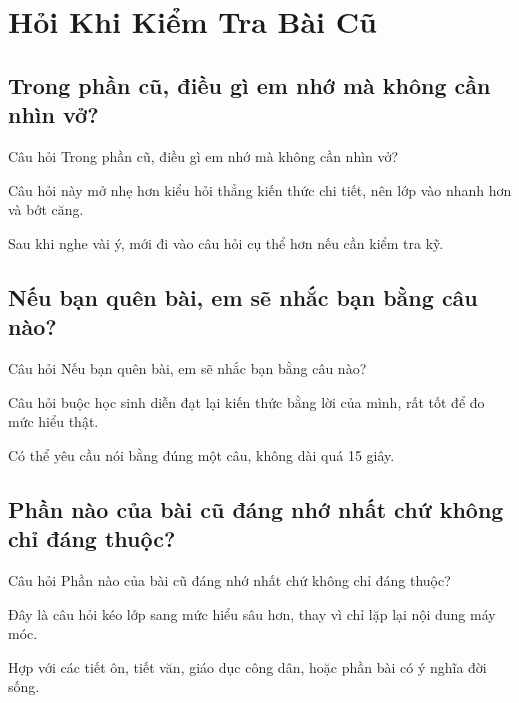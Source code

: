 \chapter{Hỏi Khi Kiểm Tra Bài Cũ}

\section{Trong phần cũ, điều gì em nhớ mà không cần nhìn vở?}
\begin{cauhoibox}{Câu hỏi}
Trong phần cũ, điều gì em nhớ mà không cần nhìn vở?
\end{cauhoibox}
\begin{taisaocoich}
Câu hỏi này mở nhẹ hơn kiểu hỏi thẳng kiến thức chi tiết, nên lớp vào nhanh hơn và bớt căng.
\end{taisaocoich}
\begin{goiybien}
Sau khi nghe vài ý, mới đi vào câu hỏi cụ thể hơn nếu cần kiểm tra kỹ.
\end{goiybien}
\ngancach

\section{Nếu bạn quên bài, em sẽ nhắc bạn bằng câu nào?}
\begin{cauhoibox}{Câu hỏi}
Nếu bạn quên bài, em sẽ nhắc bạn bằng câu nào?
\end{cauhoibox}
\begin{taisaocoich}
Câu hỏi buộc học sinh diễn đạt lại kiến thức bằng lời của mình, rất tốt để đo mức hiểu thật.
\end{taisaocoich}
\begin{goiybien}
Có thể yêu cầu nói bằng đúng một câu, không dài quá 15 giây.
\end{goiybien}
\ngancach

\section{Phần nào của bài cũ đáng nhớ nhất chứ không chỉ đáng thuộc?}
\begin{cauhoibox}{Câu hỏi}
Phần nào của bài cũ đáng nhớ nhất chứ không chỉ đáng thuộc?
\end{cauhoibox}
\begin{taisaocoich}
Đây là câu hỏi kéo lớp sang mức hiểu sâu hơn, thay vì chỉ lặp lại nội dung máy móc.
\end{taisaocoich}
\begin{goiybien}
Hợp với các tiết ôn, tiết văn, giáo dục công dân, hoặc phần bài có ý nghĩa đời sống.
\end{goiybien}
\ngancach

